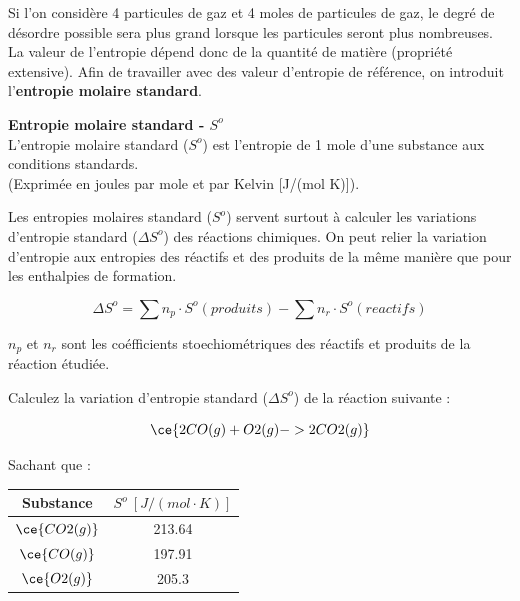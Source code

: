 \documentclass[
  11pt,
  french,
  a4paper,
  openany]{book}
\begin{document}
Si l'on considère 4 particules de gaz et 4 moles de particules de gaz, le degré de désordre possible sera plus grand lorsque les particules seront plus nombreuses. La valeur de l'entropie dépend donc de la quantité de matière (propriété extensive). Afin de travailler avec des valeur d'entropie de référence, on introduit l'\textbf{entropie molaire standard}.

\begin{tcolorbox}
\textbf{Entropie molaire standard - \(S^o\)}\\
L'entropie molaire standard (\(S^o\)) est l'entropie de 1 mole d'une substance aux conditions standards.\\
(Exprimée en joules par mole et par Kelvin {[}J/(mol K){]}).

\end{tcolorbox}

\clearpage

Les entropies molaires standard (\(S^{o}\)) servent surtout à calculer les variations d'entropie standard (\(\Delta S^{o}\)) des réactions chimiques. On peut relier la variation d'entropie aux entropies des réactifs et des produits de la même manière que pour les enthalpies de formation.

\[
\Delta S^o = \sum n_p \cdot S^{o}(produits) - \sum n_r \cdot S^{o}(reactifs)
\]

\(n_p\) et \(n_r\) sont les coéfficients stoechiométriques des réactifs et produits de la réaction étudiée.

\begin{Exercise}
Calculez la variation d'entropie standard (\(\Delta S^o\)) de la réaction suivante :

\[ \ce{2 CO(g) + O2(g) -> 2CO2(g)} \]

Sachant que :

\end{Exercise}

\begin{longtable}[]{@{}cc@{}}
\toprule
Substance & \(S^o\ [J/(mol \cdot K)]\)\tabularnewline
\midrule
\endhead
\(\ce{CO2(g)}\) & 213.64\tabularnewline
\(\ce{CO(g)}\) & 197.91\tabularnewline
\(\ce{O2(g)}\) & 205.3\tabularnewline
\bottomrule
\end{longtable}

\end{document}
